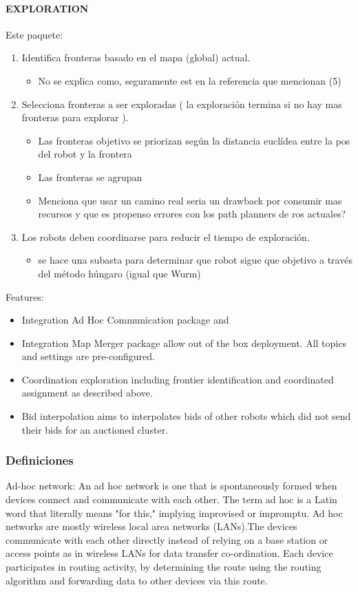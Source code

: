 \paragraph{EXPLORATION}

Este paquete:
\begin{enumerate}
\item Identifica fronteras basado en el mapa (global) actual.
  \begin{itemize}
     \item No se explica como, seguramente est en la referencia que mencionan (5)
  \end{itemize}
\item Selecciona fronteras a ser exploradas ( la exploración termina si no hay mas fronteras para explorar ).
\
  \begin{itemize}
     \item Las fronteras objetivo se priorizan según la distancia euclídea entre la pos del robot y la frontera 
     \item Las fronteras se agrupan
     \item Menciona que usar un camino real seria un drawback por consumir mas recursos y que es propenso errores con los path planners de ros actuales?
  \end{itemize}
\item Los robots deben coordinarse para reducir el tiempo de exploración.
  \begin{itemize}
     \item se hace una subasta para determinar que robot sigue que objetivo a través del método húngaro (igual que Wurm)
  \end{itemize}
\end{enumerate}

Features:
\begin{itemize}
\item Integration Ad Hoc Communication package and
\item Integration Map Merger package allow out of the box deployment. All topics and settings are pre-configured.
\item Coordination exploration including frontier identification and coordinated assignment as described above.
\item Bid interpolation aims to interpolates bids of other robots which did not send their bids for an auctioned cluster.
\end{itemize}

\subsubsection{Definiciones}
Ad-hoc network: An ad hoc network is one that is spontaneously formed when devices connect and communicate with each other. The term ad hoc is a Latin word that literally means "for this," implying improvised or impromptu. Ad hoc networks are mostly wireless local area networks (LANs).The devices communicate with each other directly instead of relying on a base station or access points as in wireless LANs for data transfer co-ordination. Each device participates in routing activity, by determining the route using the routing algorithm and forwarding data to other devices via this route. 



